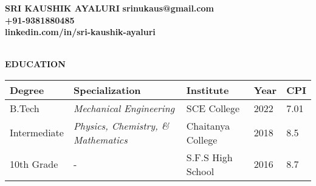 \documentclass[a4paper,10pt]{article}
\newcommand{\resheading}[1]{%
  \vspace{1em}%
  \noindent\colorbox{mygrey}{%
    \parbox{\dimexpr\linewidth-2\fboxsep\relax}{%
      \textbf{#1}%
    }%
  }%
  \vspace{0.6em}%
}
\begin{document}
\vspace*{-1.5cm}
\noindent

\textbf{SRI KAUSHIK AYALURI} \hspace{9.6cm} {\bf srinukaus@gmail.com}\\
  \hspace{10.3cm} {\bf +91-9381880485} \\
  \hspace{7.9cm} {\bf linkedin.com/in/sri-kaushik-ayaluri} \\
 \\


\resheading{EDUCATION}
\vspace{0.4em}
\begin{tabular}{ p{2.5cm} @{\hskip 0.15in} p{5.5cm} @{\hskip 0.15in} p{3.5cm} @{\hskip 0.15in} p{2.5cm} @{\hskip 0.15in} p{1.5cm} }
\toprule
\textbf{Degree} & \textbf{Specialization} & \textbf{Institute} & \textbf{Year} & \textbf{CPI} \\
\midrule
B.Tech & \textit{Mechanical Engineering} & SCE College & 2022 & 7.01 \\
Intermediate & \textit{Physics, Chemistry, \& Mathematics} & Chaitanya College & 2018 & 8.5 \\
10th Grade & - & S.F.S High School & 2016 & 8.7 \\
\bottomrule
\end{tabular}
\end{document}
